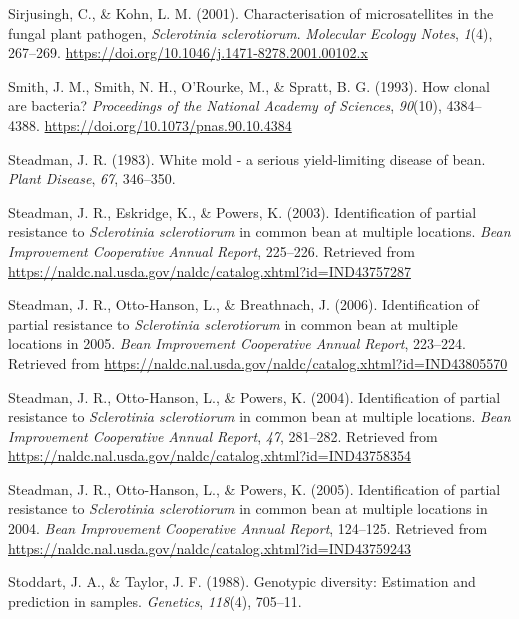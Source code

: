 \documentclass[fleqn,10pt,lineno]{wlpeerj} %
\theoremstyle{definition}
\theoremstyle{definition}
\theoremstyle{definition}
\theoremstyle{remark}
\begin{document}
\hypertarget{ref-sirjusingh2001characterisation}{}
Sirjusingh, C., \& Kohn, L. M. (2001). Characterisation of
microsatellites in the fungal plant pathogen, \emph{Sclerotinia
sclerotiorum}. \emph{Molecular Ecology Notes}, \emph{1}(4), 267--269.
\url{https://doi.org/10.1046/j.1471-8278.2001.00102.x}

\hypertarget{ref-smith1993how}{}
Smith, J. M., Smith, N. H., O'Rourke, M., \& Spratt, B. G. (1993). How
clonal are bacteria? \emph{Proceedings of the National Academy of
Sciences}, \emph{90}(10), 4384--4388.
\url{https://doi.org/10.1073/pnas.90.10.4384}

\hypertarget{ref-steadman1983white}{}
Steadman, J. R. (1983). White mold - a serious yield-limiting disease of
bean. \emph{Plant Disease}, \emph{67}, 346--350.

\hypertarget{ref-steadman2003identification}{}
Steadman, J. R., Eskridge, K., \& Powers, K. (2003). Identification of
partial resistance to \emph{Sclerotinia sclerotiorum} in common bean at
multiple locations. \emph{Bean Improvement Cooperative Annual Report},
225--226. Retrieved from
\url{https://naldc.nal.usda.gov/naldc/catalog.xhtml?id=IND43757287}

\hypertarget{ref-steadman2006identification}{}
Steadman, J. R., Otto-Hanson, L., \& Breathnach, J. (2006).
Identification of partial resistance to \emph{Sclerotinia sclerotiorum}
in common bean at multiple locations in 2005. \emph{Bean Improvement
Cooperative Annual Report}, 223--224. Retrieved from
\url{https://naldc.nal.usda.gov/naldc/catalog.xhtml?id=IND43805570}

\hypertarget{ref-steadman2004identification}{}
Steadman, J. R., Otto-Hanson, L., \& Powers, K. (2004). Identification
of partial resistance to \emph{Sclerotinia sclerotiorum} in common bean
at multiple locations. \emph{Bean Improvement Cooperative Annual
Report}, \emph{47}, 281--282. Retrieved from
\url{https://naldc.nal.usda.gov/naldc/catalog.xhtml?id=IND43758354}

\hypertarget{ref-steadman2005identification}{}
Steadman, J. R., Otto-Hanson, L., \& Powers, K. (2005). Identification
of partial resistance to \emph{Sclerotinia sclerotiorum} in common bean
at multiple locations in 2004. \emph{Bean Improvement Cooperative Annual
Report}, 124--125. Retrieved from
\url{https://naldc.nal.usda.gov/naldc/catalog.xhtml?id=IND43759243}

\hypertarget{ref-stoddart1988genotypic}{}
Stoddart, J. A., \& Taylor, J. F. (1988). Genotypic diversity:
Estimation and prediction in samples. \emph{Genetics}, \emph{118}(4),
705--11.
\end{document}
